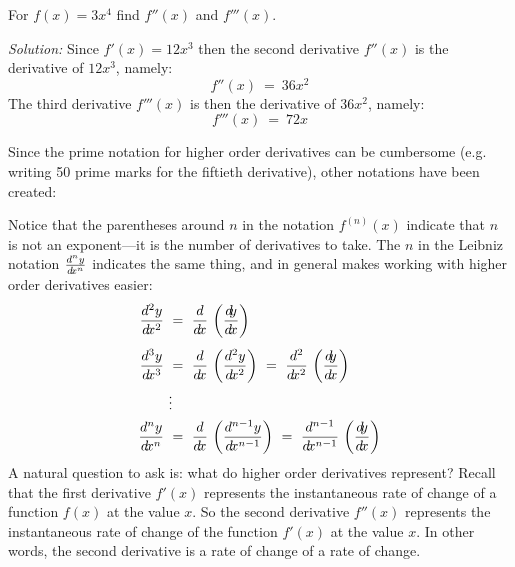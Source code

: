 \begin{exmp}
 For $f(x) = 3x^4$ find $f''(x)$ and $f'''(x)$.\vspace{1mm}
 \par\noindent\emph{Solution:} Since $f'(x) = 12x^3$ then the second derivative
 $f''(x)$ is the derivative of $12x^3$, namely:
 \begin{displaymath}
  f''(x) ~=~ 36x^2
 \end{displaymath}
 The third derivative $f'''(x)$ is then the derivative of $36x^2$, namely:
 \begin{displaymath}
  f'''(x) ~=~ 72x
 \end{displaymath}
\end{exmp}\vspace{-2mm}
\divider
\vspace{3mm}

Since the prime notation for higher order derivatives can be cumbersome (e.g.
writing 50 prime marks for the fiftieth derivative), other notations have been
created:


Notice that the parentheses around $n$ in the notation $f^{(n)}(x)$ indicate
that $n$ is not an exponent---it is the number of derivatives to take. The $n$
in the Leibniz notation $\frac{d^ny}{d\!x^n}$ indicates the same thing, and in
general makes working with higher order derivatives easier:
\begin{align*}
 \frac{d^2y}{\dx^2} ~&=~ \ddx\,\left(\dydx\right)\\[4pt]
 \frac{d^3y}{\dx^3} ~&=~ \ddx\,\left(\frac{d^2y}{\dx^2}\right)
                     ~=~ \frac{d^2}{\dx^2}\,\left(\dydx\right)\\
                     &\vdots\\
 \frac{d^ny}{\dx^n} ~&=~ \ddx\,\left(\frac{d^{n-1}y}{\dx^{n-1}}\right)
                    ~=~ \frac{d^{n-1}}{\dx^{n-1}}\,\left(\dydx\right)
\end{align*}
\newpage
A natural question to ask is: what do higher order derivatives represent? Recall that
the first derivative $f'(x)$ represents the instantaneous rate of change of a function
$f(x)$ at the value $x$. So the second derivative $f''(x)$ represents the instantaneous
rate of change of the function $f'(x)$ at the value $x$. In other words, the second
derivative is a rate of change of a rate of change.

